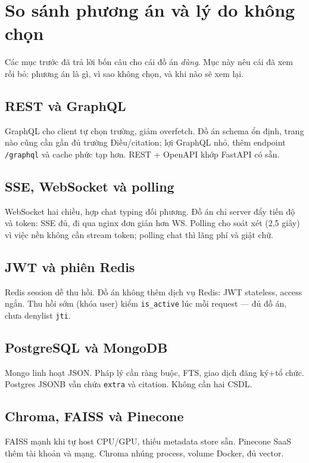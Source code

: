 \section{So sánh phương án và lý do không chọn}

Các mục trước đã trả lời bốn câu cho cái đồ án \emph{dùng}. Mục này nêu cái đã
xem rồi bỏ: phương án là gì, vì sao không chọn, và khi nào sẽ xem lại.

\subsection{REST và GraphQL}

GraphQL cho client tự chọn trường, giảm overfetch. Đồ án schema ổn định, trang
nào cũng cần gần đủ trường Điều/citation; lợi GraphQL nhỏ, thêm endpoint
\texttt{/graphql} và cache phức tạp hơn. REST + OpenAPI khớp FastAPI có sẵn.

\subsection{SSE, WebSocket và polling}

WebSocket hai chiều, hợp chat typing đối phương. Đồ án chỉ server đẩy tiến độ
và token: SSE đủ, đi qua nginx đơn giản hơn WS. Polling cho soát xét (2,5 giây)
vì việc nền không cần stream token; polling chat thì lãng phí và giật chữ.

\subsection{JWT và phiên Redis}

Redis session dễ thu hồi. Đồ án không thêm dịch vụ Redis: JWT stateless, access
ngắn. Thu hồi sớm (khóa user) kiểm \texttt{is\_active} lúc mỗi request --- đủ
đồ án, chưa denylist \texttt{jti}.

\subsection{PostgreSQL và MongoDB}

Mongo linh hoạt JSON. Pháp lý cần ràng buộc, FTS, giao dịch đăng ký+tổ chức.
Postgres JSONB vẫn chứa \texttt{extra} và citation. Không cần hai CSDL.

\subsection{Chroma, FAISS và Pinecone}

FAISS mạnh khi tự host CPU/GPU, thiếu metadata store sẵn. Pinecone SaaS thêm
tài khoản và mạng. Chroma nhúng process, volume Docker, đủ \soDieu{} vector.


